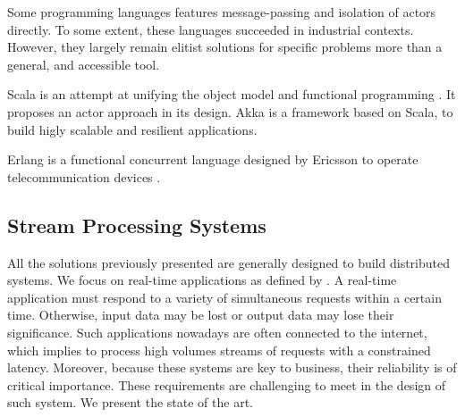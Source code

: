 
Some programming languages features message-passing and isolation of actors directly.
To some extent, these languages succeeded in industrial contexts.
However, they largely remain elitist solutions for specific problems more than a general, and accessible tool.

Scala is an attempt at unifying the object model and functional programming \cite{Odersky2004}.
It proposes an actor approach in its design.
Akka is a framework based on Scala, to build higly scalable and resilient applications.

Erlang is a functional concurrent language designed by Ericsson to operate telecommunication devices \cite{JoeArmstrong}.

\subsection{Stream Processing Systems} \label{chapter3:parallel-execution:stream-processing}

All the solutions previously presented are generally designed to build distributed systems.
We focus on real-time applications as defined by \cite{Hansen1978}.
A real-time application must respond to a variety of simultaneous requests within a certain time.
Otherwise, input data may be lost or output data may lose their significance.
Such applications nowadays are often connected to the internet, which implies to process high volumes streams of requests with a constrained latency.
Moreover, because these systems are key to business, their reliability is of critical importance.
These requirements are challenging to meet in the design of such system.
We present the state of the art.



